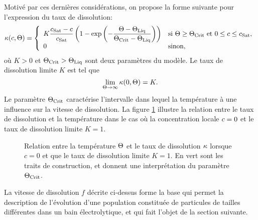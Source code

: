 Motivé par ces dernières considérations, on propose la forme suivante
pour l'expression du taux de dissolution:
\begin{equation}\label{eq:dissolution-rate}
  \kappa(c, \Theta) =
  \left\{
  \begin{array}{ll}
    K\displaystyle\frac{c_\text{Sat} - c}{c_\text{Sat}}\left( 1 -
      \exp\left( -\displaystyle\frac{\Theta - \Theta_\text{Liq}}{\Theta_\text{Crit} -
          \Theta_\text{Liq}} \right) \right) & \text{si }\Theta \geq \Theta_\text{Crit}\text{ et }
    0\leq c
    \leq c_\text{Sat},\\
    0                                     & \text{sinon,}
  \end{array}
  \right.
\end{equation}
où $K > 0$ et $\Theta_\text{Crit} > \Theta_\text{Liq}$ sont deux paramètres du modèle. Le taux
de dissolution limite $K$ est tel que
\begin{equation}
  \lim_{\Theta \to\infty}\kappa(0, \Theta) = K.
\end{equation}
Le paramètre $\Theta_\text{Crit}$ caractérise l'intervalle dans lequel la
température à une influence sur la vitesse de dissolution. La figure
\ref{fig:diss-rate} illustre la relation entre le taux de dissolution
et la température dans le cas où la concentration locale
$c = 0$ et le taux de dissolution limite $K = 1$.

\begin{figure}[h]
  \begin{center}
    
    \caption{Relation entre la température $\Theta$ et le taux de
      dissolution $\kappa$ lorsque $c = 0$ et que le taux
      de dissolution limite $K = 1$. En vert sont les traits de
      construction, et donnent une interprétation du paramètre
      $\Theta_\text{Crit}$.}
    \label{fig:diss-rate}
  \end{center}
\end{figure}

La vitesse de dissolution $f$ décrite ci-dessus forme la base qui
permet la description de l'évolution d'une population constituée de
particules de tailles différentes dans un bain électrolytique, et qui
fait l'objet de la section suivante.
